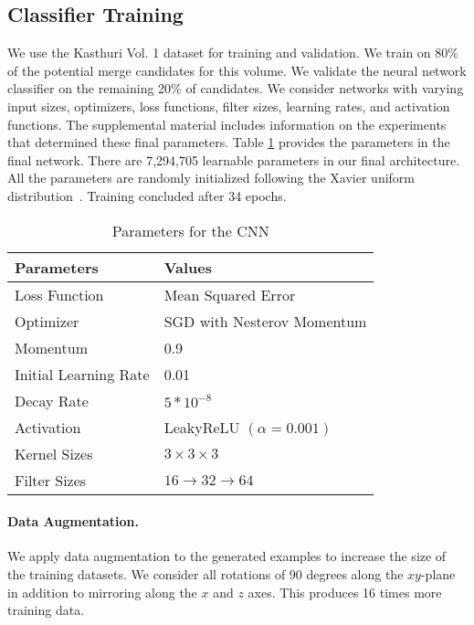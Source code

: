\subsection{Classifier Training}
\label{sec:network-parameters}
We use the Kasthuri Vol. 1 dataset for training and validation. 
We train on 80\% of the potential merge candidates for this volume.
We validate the neural network classifier on the remaining 20\% of candidates. 
We consider networks with varying input sizes, optimizers, loss functions, filter sizes, learning rates, and activation functions. 
The supplemental material includes information on the experiments that determined these final parameters. 
Table \ref{table:architecture} provides the parameters in the final network.
There are 7,294,705 learnable parameters in our final architecture.
All the parameters are randomly initialized following the Xavier uniform distribution~\cite{glorot2010understanding}. 
Training concluded after 34 epochs. 

\begin{table}[h!]
	\centering
	\begin{tabular}{l l} \hline
		\textbf{Parameters} & \textbf{Values} \\ \hline
		Loss Function & Mean Squared Error \\
		Optimizer & SGD  with Nesterov Momentum \\
		Momentum & 0.9 \\
		Initial Learning Rate & 0.01 \\
		Decay Rate & $5 * 10^{-8}$ \\
		Activation & LeakyReLU $(\alpha = 0.001)$ \\
		Kernel Sizes & $3 \times 3 \times 3$ \\
		Filter Sizes & $16 \to 32 \to 64$ \\ \hline
	\end{tabular}
	\caption{Parameters for the CNN}
	\label{table:architecture}
\end{table}



\paragraph{Data Augmentation.}
We apply data augmentation to the generated examples to increase the size of the training datasets. 
We consider all rotations of $90$ degrees along the $xy$-plane in addition to mirroring along the $x$ and $z$ axes. 
This produces 16 times more training data. 

